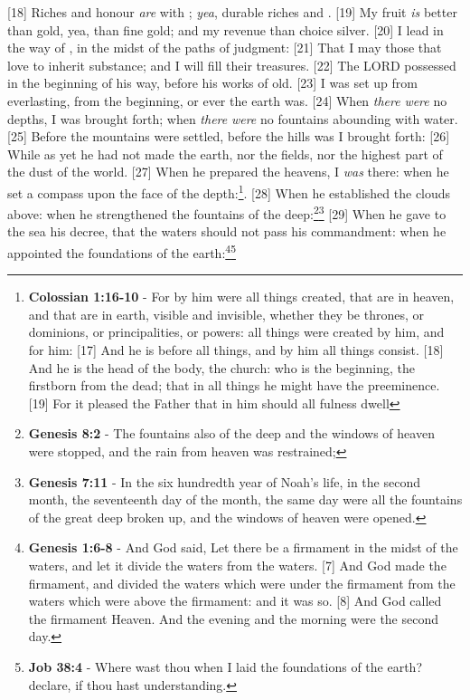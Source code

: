 [18] \textcolor[cmyk]{0.99998,1,0,0}{Riches and honour \emph{are} with ; \emph{yea}, durable riches and .}
[19] \textcolor[cmyk]{0.99998,1,0,0}{My fruit \emph{is} better than gold, yea, than fine gold; and my revenue than choice silver.}
[20] \textcolor[cmyk]{0.99998,1,0,0}{I lead in the way of , in the midst of the paths of judgment:}
[21] \textcolor[cmyk]{0.99998,1,0,0}{That I may  those that love  to inherit substance; and I will fill their treasures.}
[22] \textcolor[cmyk]{0.99998,1,0,0}{The LORD possessed  in the beginning of his way, before his works of old.}
[23] \textcolor[cmyk]{0.99998,1,0,0}{I was set up from everlasting, from the beginning, or ever the earth was.}
[24] \textcolor[cmyk]{0.99998,1,0,0}{When \emph{there} \emph{were} no depths, I was brought forth; when \emph{there} \emph{were} no fountains abounding with water.}
[25] \textcolor[cmyk]{0.99998,1,0,0}{Before the mountains were settled, before the hills was I brought forth:}
[26] \textcolor[cmyk]{0.99998,1,0,0}{While as yet he had not made the earth, nor the fields, nor the highest part of the dust of the world.}
[27] \textcolor[cmyk]{0.99998,1,0,0}{When he prepared the heavens, I \emph{was} there: when he set a compass upon the face of the depth:}\footnote{\textbf{Colossian 1:16-10} - For by him were all things created, that are in heaven, and that are in earth, visible and invisible, whether they be thrones, or dominions, or principalities, or powers: all things were created by him, and for him: [17] And he is before all things, and by him all things consist. [18] And he is the head of the body, the church: who is the beginning, the firstborn from the dead; that in all things he might have the preeminence. [19] For it pleased the Father that in him should all fulness dwell}.
[28] \textcolor[cmyk]{0.99998,1,0,0}{When he established the clouds above: when he strengthened the fountains of the deep:}\footnote{\textbf{Genesis 8:2} - The fountains also of the deep and the windows of heaven were stopped, and the rain from heaven was restrained;}\footnote{\textbf{Genesis 7:11} - In the six hundredth year of Noah’s life, in the second month, the seventeenth day of the month, the same day were all the fountains of the great deep broken up, and the windows of heaven were opened.}
[29] \textcolor[cmyk]{0.99998,1,0,0}{When he gave to the sea his decree, that the waters should not pass his commandment: when he appointed the foundations of the earth:}\footnote{\textbf{Genesis 1:6-8} - And God said, Let there be a firmament in the midst of the waters, and let it divide the waters from the waters. [7] And God made the firmament, and divided the waters which were under the firmament from the waters which were above the firmament: and it was so. [8] And God called the firmament Heaven. And the evening and the morning were the second day. }\footnote{\textbf{Job 38:4} - Where wast thou when I laid the foundations of the earth? declare, if thou hast understanding.}

